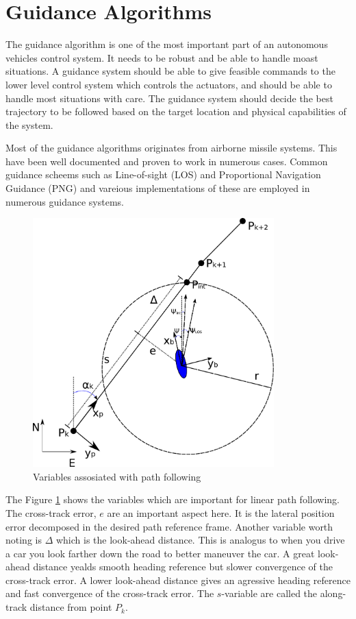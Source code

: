 \section{Guidance Algorithms}
        \label{chap1-guidance-alg}
        The guidance algorithm is one of the most important part of an autonomous vehicles control system. It
	needs to be robust and be able to handle moast situations. A guidance system should be able to give
	feasible commands to the lower level control system which controls the actuators, and should be able
	to handle most situations with care. The guidance system should decide the best trajectory to be
	followed based on the target location and physical capabilities of the system.\cite{GuidanceReview}

	Most of the guidance algorithms originates from airborne missile systems. This have been well
	documented and proven to work in numerous cases. Common guidance scheems such as Line-of-sight (LOS)
	and Proportional Navigation Guidance (PNG) and vareious implementations of these are employed in
	numerous guidance systems.
	
		\begin{figure}[hbtp]
		\centering
		\includegraphics[width=0.83\textwidth]{pics/waypoint}
		\caption{Variables assosiated with path following}
		\label{fig:ch2-pathfollowing}
	\end{figure}
	The Figure \ref{fig:ch2-pathfollowing} shows the variables which are important for linear path following. The
	cross-track error, $e$ are an important aspect here. It is the lateral position error decomposed in
	the desired path reference frame. Another variable worth noting is $\Delta$ which is the look-ahead
	distance. This is analogus to when you drive a car you look farther down the road to better maneuver
	the car. A great look-ahead distance yealds smooth heading reference but slower convergence of the
	cross-track error. A lower look-ahead distance gives an agressive heading reference and fast
	convergence of the cross-track error. The $s$-variable are called the along-track distance from point
	$P_k$. 
	
